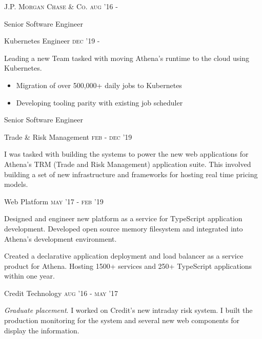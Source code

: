 
\textsc{\small{J.P. Morgan Chase \& Co. }}
\hfill
\textsc{\small{\raggedleft aug '16 -}}

{\Large Senior Software Engineer}

\vspace{5pt}

{\large Kubernetes Engineer}
\hfill
\textsc{\small{\raggedleft dec '19 -}}

Leading a new Team tasked with moving Athena's runtime to the cloud using Kubernetes. 

\begin{itemize}
	\item Migration of over 500,000+ daily jobs to Kubernetes
	\item Developing tooling parity with existing job scheduler
\end{itemize}

\vspace{8pt}

{\Large Senior Software Engineer}

\vspace{5pt}

{\large Trade \& Risk Management}
\hfill
\textsc{\small{\raggedleft feb - dec '19}}

I was tasked with building the systems to power the new web applications for Athena's TRM (Trade and Risk Management) application suite. This involved building a set of new infrastructure and frameworks for hosting real time pricing models. 

\vspace{8pt}

{\large Web Platform}
\hfill
\textsc{\small{\raggedleft may '17 - feb '19}}

Designed and engineer new platform as a service for TypeScript application development. Developed open source memory filesystem and  integrated into Athena's development environment. 

Created a declarative application deployment and load balancer as a service product for Athena. Hosting 1500+ services and 250+ TypeScript applications within one year.

\vspace{8pt}

{\large Credit Technology}
\hfill
\textsc{\small{\raggedleft aug '16 - may '17}}

\textit{Graduate placement}. I worked on Credit's new intraday risk system. I built the production monitoring for the system and several new web components for display the information. 